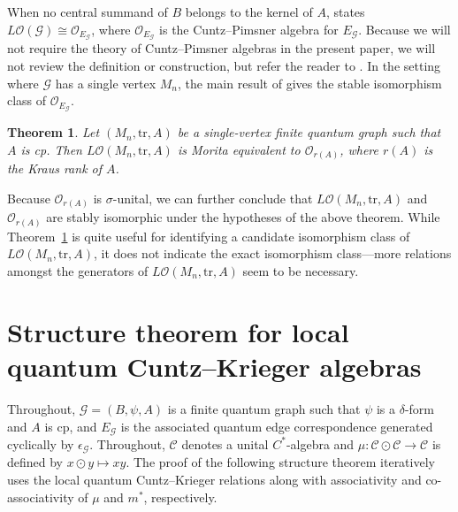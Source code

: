 \documentclass[11pt]{article}
\theoremstyle{plain}
\newtheorem{theorem}[lemma]{Theorem}
\theoremstyle{nonumberplain}
\theoremstyle{plain}
\theoremstyle{nonumberplain}
\newcommand\1{{\bf 1}}
\newcommand\cG{{\mathcal G}}
\newcommand\cO{{\mathcal O}}
\newcommand{\tr}{\text{tr}} %
\newcommand{\<}{\left\langle}
\renewcommand{\>}{\right\rangle}
\begin{document}
When no central summand of $B$ belongs to the kernel of $A$, \cite[Corollary 3.7]{BHINW23} states $L\cO(\cG)\cong \cO_{E_{\cG}}$, where $\cO_{E_\cG}$ is the Cuntz--Pimsner algebra for $E_\cG$. Because we will not require the theory of Cuntz--Pimsner algebras in the present paper, we will not review the definition or construction, but refer the reader to \cite{Katsura04}. In the setting where $\cG$ has a single vertex $M_n$, the main result of \cite{Marrero-Muhly05} gives the stable isomorphism class of $\cO_{E_\cG}$.


\begin{theorem}\label{thm:morita_equivalence}
Let $(M_n,\tr,A)$ be a single-vertex finite quantum graph such that $A$ is cp. Then $L\cO(M_n,\tr,A)$ is Morita equivalent to $\cO_{r(A)}$, where $r(A)$ is the Kraus rank of $A$.
\end{theorem}


\noindent Because $\cO_{r(A)}$ is $\sigma$-unital, we can further conclude that $L\cO(M_n,\tr,A)$ and $\cO_{r(A)}$ are stably isomorphic under the hypotheses of the above theorem. While Theorem~\ref{thm:morita_equivalence} is quite useful for identifying a candidate isomorphism class of $L\cO(M_n,\tr,A)$, it does not indicate the exact isomorphism class---more relations amongst the generators of $L\cO(M_n,\tr,A)$ seem to be necessary. 




\section{Structure theorem for local quantum Cuntz--Krieger algebras}\label{sec:lqck_structure_theorem}

Throughout, $\cG=(B,\psi,A)$ is a finite quantum graph such that $\psi$ is a $\delta$-form and $A$ is cp, and $E_\cG$ is the associated quantum edge correspondence generated cyclically by $\epsilon_\cG$. %
Throughout, $\mathcal{C}$ denotes a unital $C^*$-algebra and $\mu:\mathcal{C}\odot \mathcal{C}\to \mathcal{C}$ is defined by $x\odot y\mapsto xy$. The proof of the following structure theorem iteratively uses the local quantum Cuntz--Krieger relations along with associativity and co-associativity of $\mu$ and $m^*$, respectively.
\end{document}

